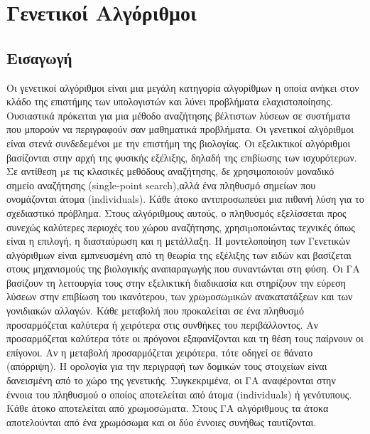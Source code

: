 \section{Γενετικοί Αλγόριθμοι}
\subsection{Εισαγωγή}

Οι γενετικοί αλγόριθμοι είναι μια μεγάλη κατηγορία αλγορίθμων η οποία ανήκει στον κλάδο της επιστήμης των υπολογιστών και λύνει προβλήματα ελαχιστοποίησης. Ουσιαστικά πρόκειται για μια μέθοδο αναζήτησης βέλτιστων λύσεων σε συστήματα που μπορούν να περιγραφούν σαν μαθηματικά προβλήματα. Οι γενετικοί αλγόριθμοι είναι στενά συνδεδεμένοι με την επιστήμη της βιολογίας. Οι εξελικτικοί αλγόριθμοι βασίζονται στην αρχή της φυσικής εξέλιξης, δηλαδή της επιβίωσης των ισχυρότερων. Σε αντίθεση µε τις κλασικές μεθόδους αναζήτησης, δε χρησιμοποιούν μοναδικό σημείο αναζήτησης (single-point search),αλλά ένα πληθυσμό σημείων που ονομάζονται άτομα (individuals). Κάθε άτοκο αντιπροσωπεύει μια πιθανή λύση για το σχεδιαστικό πρόβλημα. Στους αλγόριθμους αυτούς, ο πληθυσμός εξελίσσεται προς συνεχώς καλύτερες περιοχές του χώρου αναζήτησης, χρησιµοποιώντας τεχνικές όπως είναι η επιλογή, η διασταύρωση και η μετάλλαξη.
Η μοντελοποίηση των Γενετικών αλγόριθμων είναι εμπνευσμένη από τη θεωρία της εξέλιξης των ειδών και βασίζεται στους μηχανισμούς της βιολογικής αναπαραγωγής που συναντώνται στη φύση. Οι ΓΑ βασίζουν τη λειτουργία τους στην εξελικτική διαδικασία και στηρίζουν την εύρεση λύσεων στην επιβίωση του ικανότερου, των χρωµοσωµικών ανακατατάξεων και των γονιδιακών αλλαγών. Κάθε μεταβολή που προκαλείται σε ένα πληθυσμό προσαρμόζεται καλύτερα ή χειρότερα στις συνθήκες του περιβάλλοντος. Αν προσαρμόζεται καλύτερα τότε οι πρόγονοι εξαφανίζονται και τη θέση τους παίρνουν οι επίγονοι. Αν η μεταβολή προσαρμόζεται χειρότερα, τότε οδηγεί σε θάνατο (απόρριψη). Η ορολογία για την περιγραφή των δομικών τους στοιχείων είναι δανεισμένη από το χώρο της γενετικής.
Συγκεκριμένα, οι ΓΑ αναφέρονται στην έννοια του πληθυσμού ο οποίος αποτελείται από άτομα (individuals) ή γενότυπους. Κάθε άτοκο αποτελείται από χρωµοσώµατα.
Στους ΓΑ αλγόριθμους τα άτοκα αποτελούνται από ένα χρωμόσωμα και οι δύο
έννοιες συνήθως ταυτίζονται.

